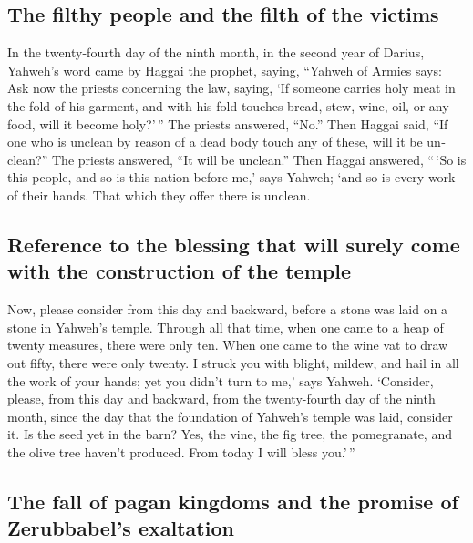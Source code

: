 \begin{paracol}{2}
\begin{otherlanguage}{english}
\hypertarget{the-filthy-people-and-the-filth-of-the-victims}{%
\subsection{The filthy people and the filth of the
victims}\label{the-filthy-people-and-the-filth-of-the-victims}}

 In the twenty-fourth day of the ninth month, in the
second year of Darius, Yahweh's word came by Haggai the prophet, saying,
 ``Yahweh of Armies says: Ask now the priests concerning
the law, saying,  `If someone carries holy meat in the
fold of his garment, and with his fold touches bread, stew, wine, oil,
or any food, will it become holy?'\,'' The priests answered, ``No.''
 Then Haggai said, ``If one who is unclean by reason of a
dead body touch any of these, will it be unclean?'' The priests
answered, ``It will be unclean.''  Then Haggai answered,
``\,`So is this people, and so is this nation before me,' says Yahweh;
`and so is every work of their hands. That which they offer there is
unclean.

\hypertarget{reference-to-the-blessing-that-will-surely-come-with-the-construction-of-the-temple}{%
\subsection{Reference to the blessing that will surely come with the
construction of the
temple}\label{reference-to-the-blessing-that-will-surely-come-with-the-construction-of-the-temple}}

 Now, please consider from this day and backward, before
a stone was laid on a stone in Yahweh's temple.  Through
all that time, when one came to a heap of twenty measures, there were
only ten. When one came to the wine vat to draw out fifty, there were
only twenty.  I struck you with blight, mildew, and hail
in all the work of your hands; yet you didn't turn to me,' says Yahweh.
 `Consider, please, from this day and backward, from the
twenty-fourth day of the ninth month, since the day that the foundation
of Yahweh's temple was laid, consider it.  Is the seed
yet in the barn? Yes, the vine, the fig tree, the pomegranate, and the
olive tree haven't produced. From today I will bless you.'\,''

\hypertarget{the-fall-of-pagan-kingdoms-and-the-promise-of-zerubbabels-exaltation}{%
\subsection{The fall of pagan kingdoms and the promise of Zerubbabel's
exaltation}\label{the-fall-of-pagan-kingdoms-and-the-promise-of-zerubbabels-exaltation}}


\end{otherlanguage}
\end{paracol}
